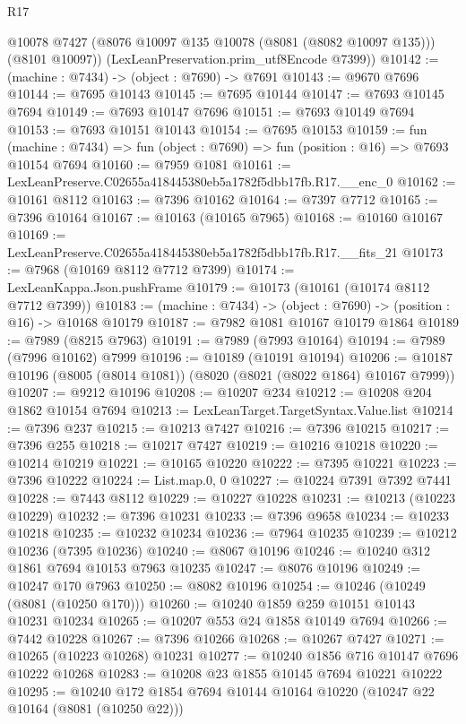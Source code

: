 \begin{lexlean}{R17}
\begin{coremodule}
        @10078
        @7427
        (@8076 @10097 @135 @10078 (@8081 (@8082 @10097 @135)))
        (@8101 @10097))
      (LexLeanPreservation.prim_utf8Encode @7399))
@10142 := (machine : @7434) -> (object : @7690) -> @7691
@10143 := @9670 @7696
@10144 := @7695 @10143
@10145 := @7695 @10144
@10147 := @7693 @10145 @7694
@10149 := @7693 @10147 @7696
@10151 := @7693 @10149 @7694
@10153 := @7693 @10151 @10143
@10154 := @7695 @10153
@10159 := fun (machine : @7434) =>
  fun (object : @7690) => fun (position : @16) => @7693 @10154 @7694
@10160 := @7959 @1081
@10161 := LexLeanPreserve.C02655a418445380eb5a1782f5dbb17fb.R17.__enc_0
@10162 := @10161 @8112
@10163 := @7396 @10162
@10164 := @7397 @7712
@10165 := @7396 @10164
@10167 := @10163 (@10165 @7965)
@10168 := @10160 @10167
@10169 := LexLeanPreserve.C02655a418445380eb5a1782f5dbb17fb.R17.__fits_21
@10173 := @7968 (@10169 @8112 @7712 @7399)
@10174 := LexLeanKappa.Json.pushFrame
@10179 := @10173 (@10161 (@10174 @8112 @7712 @7399))
@10183 := (machine : @7434) -> (object : @7690) -> (position : @16) -> @10168 @10179
@10187 := @7982 @1081 @10167 @10179 @1864
@10189 := @7989 (@8215 @7963)
@10191 := @7989 (@7993 @10164)
@10194 := @7989 (@7996 @10162) @7999
@10196 := @10189 (@10191 @10194)
@10206 := @10187 @10196 (@8005 (@8014 @1081)) (@8020 (@8021 (@8022 @1864) @10167 @7999))
@10207 := @9212 @10196
@10208 := @10207 @234
@10212 := @10208 @204 @1862 @10154 @7694
@10213 := LexLeanTarget.TargetSyntax.Value.list
@10214 := @7396 @237
@10215 := @10213 @7427
@10216 := @7396 @10215
@10217 := @7396 @255
@10218 := @10217 @7427
@10219 := @10216 @10218
@10220 := @10214 @10219
@10221 := @10165 @10220
@10222 := @7395 @10221
@10223 := @7396 @10222
@10224 := List.map.{0, 0}
@10227 := @10224 @7391 @7392 @7441
@10228 := @7443 @8112
@10229 := @10227 @10228
@10231 := @10213 (@10223 @10229)
@10232 := @7396 @10231
@10233 := @7396 @9658
@10234 := @10233 @10218
@10235 := @10232 @10234
@10236 := @7964 @10235
@10239 := @10212 @10236 (@7395 @10236)
@10240 := @8067 @10196
@10246 := @10240 @312 @1861 @7694 @10153 @7963 @10235
@10247 := @8076 @10196
@10249 := @10247 @170 @7963
@10250 := @8082 @10196
@10254 := @10246 (@10249 (@8081 (@10250 @170)))
@10260 := @10240 @1859 @259 @10151 @10143 @10231 @10234
@10265 := @10207 @553 @24 @1858 @10149 @7694
@10266 := @7442 @10228
@10267 := @7396 @10266
@10268 := @10267 @7427
@10271 := @10265 (@10223 @10268) @10231
@10277 := @10240 @1856 @716 @10147 @7696 @10222 @10268
@10283 := @10208 @23 @1855 @10145 @7694 @10221 @10222
@10295 := @10240 @172 @1854 @7694 @10144 @10164 @10220 (@10247 @22 @10164 (@8081 (@10250 @22)))

\end{coremodule}
\end{lexlean}
